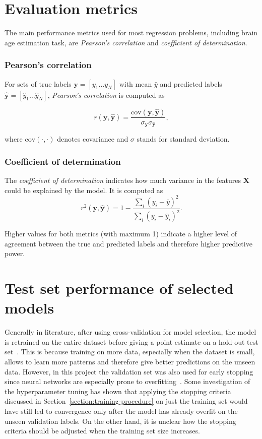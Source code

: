\section{Evaluation metrics}
\label{section:evaluation-metrics}
The main performance metrics used for most regression problems, including brain age estimation task, are \textit{Pearson's correlation} and \textit{coefficient of determination}.

\subsubsection{Pearson's correlation}
For sets of true labels $\mathbf{y}  = [y_1 \dots y_N]$ with mean $\bar{y}$ and predicted labels $\mathbf{\hat{y}} = [\hat{y}_1 \dots \hat{y}_N]$, \textit{Pearson's correlation} is computed as

\begin{equation}
    r(\mathbf{y}, \mathbf{\hat{y}}) = \frac{\mathrm{cov}(\mathbf{y}, \mathbf{\hat{y}})}{\sigma_{\mathbf{y}} \sigma_{\mathbf{\hat{y}}}},
\end{equation}

where $\mathrm{cov}(\cdot, \cdot)$ denotes covariance and $\sigma$ stands for standard deviation. 

\subsubsection{Coefficient of determination}
The \textit{coefficient of determination} indicates how much variance in the features $\mathbf{X}$ could be explained by the model. It is computed as 
\begin{equation}
    r^2(\mathbf{y}, \mathbf{\hat{y}}) = 1 - \frac{\sum_{i} (y_i - \bar{y})^2}{\sum_{i} (y_i - \hat{y}_i)^2}.
\end{equation}

Higher values for both metrics (with maximum 1) indicate a higher level of agreement between the true and predicted labels and therefore higher predictive power.


\section{Test set performance of selected models}
Generally in literature, after using cross-validation for model selection, the model is retrained on the entire dataset before giving a point estimate on a hold-out test set~\cite{raschka2018model}. This is because training on more data, especially when the dataset is small, allows to learn more patterns and therefore give better predictions on the unseen data. However, in this project the validation set was also used for early stopping since neural networks are especially prone to overfitting~\cite{prechelt1998automatic}. Some investigation of the hyperparameter tuning has shown that applying the stopping criteria discussed in Section~\ref{section:training-procedure} on just the training set would have still led to convergence only after the model has already overfit on the unseen validation labels. On the other hand, it is unclear how the stopping criteria should be adjusted when the training set size increases. 

